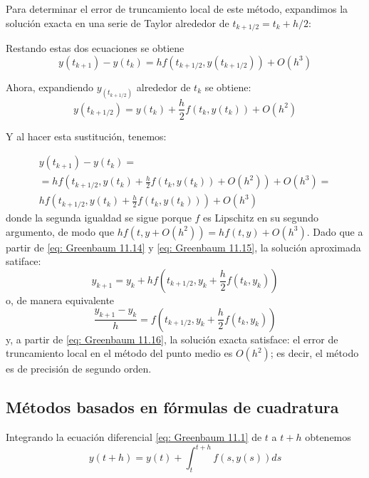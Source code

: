 Para determinar el error de truncamiento local de este método, expandimos la solución exacta en una serie de Taylor alrededor de $t_{k + 1/2} = t_k + h/2$:

Restando estas dos ecuaciones se obtiene
\[y(t_{k + 1}) - y(t_k) = h f(t_{k + 1/2}, y(t_{k + 1/2})) + O(h^3)\]

Ahora, expandiendo $y_(t_{k + 1/2})$ alrededor de $t_k$ se obtiene:
\[ y(t_{k + 1/2}) = y(t_k) + \frac{h}{2} f(t_k, y(t_k)) + O(h^2) \]

Y al hacer esta sustitución, tenemos:

\begin{multline}
    \label{eq: Greenbaum 11.16}
    y(t_{k + 1}) - y(t_k) = \\
    = h f(t_{k  + 1/2}, y(t_k) + \frac{h}{2} f(t_k, y(t_k)) + O(h^2)) + O(h^3) = \\
    hf(t_{k + 1/2}, y(t_k) + \frac{h}{2} f(t_k, y(t_k))) + O(h^3)
\end{multline}
donde la segunda igualdad se sigue porque $f$ es Lipschitz en su segundo argumento, de modo que $hf(t, y + O(h^2)) = hf(t,y) + O(h^3)$. Dado que a partir de \ref{eq: Greenbaum 11.14} y \ref{eq: Greenbaum 11.15}, la solución aproximada satiface:
\[ y_{k + 1} = y_k + hf(t_{k + 1/2}, y_k + \frac{h}{2} f(t_k, y_k)) \]
o, de manera equivalente 
\[ \frac{y_{k + 1} - y_k}{h} = f(t_{k + 1/2}, y_k + \frac{h}{2} f(t_k, y_k)) \]
y, a partir de \ref{eq: Greenbaum 11.16}, la solución exacta satisface:
el error de truncamiento local en el método del punto medio es $O(h^2)$; es decir, el método es de precisión de segundo orden.

\subsection{Métodos basados en fórmulas de cuadratura}

Integrando la ecuación diferencial \ref{eq: Greenbaum 11.1} de $t$ a $t + h$ obtenemos
\begin{equation}
    \label{eq: Greenbaum 11.17}
    y(t + h) = y(t) + \int_{t}^{t + h} f(s, y(s)) ds
\end{equation}


